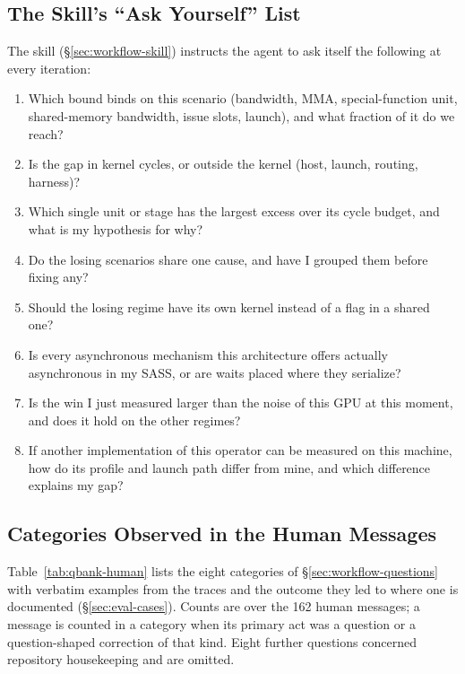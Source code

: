 \subsection{The Skill's ``Ask Yourself'' List}
The skill (\S\ref{sec:workflow-skill}) instructs the agent to ask itself the following at every
iteration:
\begin{enumerate}[nosep,leftmargin=*]
\item Which bound binds on this scenario (bandwidth, MMA, special-function unit, shared-memory bandwidth, issue slots, launch), and what fraction of it do we reach?
\item Is the gap in kernel cycles, or outside the kernel (host, launch, routing, harness)?
\item Which single unit or stage has the largest excess over its cycle budget, and what is my hypothesis for why?
\item Do the losing scenarios share one cause, and have I grouped them before fixing any?
\item Should the losing regime have its own kernel instead of a flag in a shared one?
\item Is every asynchronous mechanism this architecture offers actually asynchronous in my SASS, or are waits placed where they serialize?
\item Is the win I just measured larger than the noise of this GPU at this moment, and does it hold on the other regimes?
\item If another implementation of this operator can be measured on this machine, how do its profile and launch path differ from mine, and which difference explains my gap?
\end{enumerate}

\subsection{Categories Observed in the Human Messages}
Table~\ref{tab:qbank-human} lists the eight categories of \S\ref{sec:workflow-questions} with verbatim
examples from the traces and the outcome they led to where one is documented
(\S\ref{sec:eval-cases}). Counts are over the 162 human messages; a message is counted in a category
when its primary act was a question or a question-shaped correction of that kind. Eight further
questions concerned repository housekeeping and are omitted.

